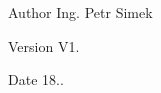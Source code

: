 \begin{DoxyAuthor}{Author}
Ing. Petr Simek 
\end{DoxyAuthor}
\begin{DoxyVersion}{Version}
V1. 
\end{DoxyVersion}
\begin{DoxyDate}{Date}
18.. 
\end{DoxyDate}
